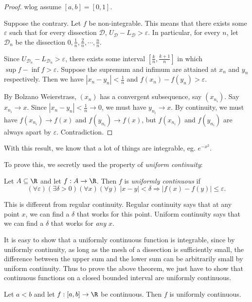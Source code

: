 \documentclass[a4paper]{article}
\begin{document}
\begin{proof}
  wlog assume $[a, b] = [0, 1]$.

  Suppose the contrary. Let $f$ be non-integrable. This means that there exists some $\varepsilon$ such that for every dissection $\mathcal{D}$, $U_{\mathcal{D}} - L_{\mathcal{D}} > \varepsilon$. In particular, for every $n$, let $\mathcal{D}_n$ be the dissection $0, \frac{1}{n}, \frac{2}{n}, \cdots, \frac{n}{n}$.

  Since $U_{\mathcal{D}_n} - L_{\mathcal{D}_n} > \varepsilon$, there exists some interval $\left[\frac{k}{n}, \frac{k + 1}{n}\right]$ in which $\sup f - \inf f > \varepsilon$. Suppose the supremum and infimum are attained at $x_n$ and $y_n$ respectively. Then we have $|x_n - y_n| < \frac{1}{n}$ and $f(x_n) - f(y_n) > \varepsilon$.

  By Bolzano Weierstrass, $(x_n)$ has a convergent subsequence, say $(x_{n_i})$. Say $x_{n_i}\to x$. Since $|x_n - y_n| < \frac{1}{n}\to 0$, we must have $y_{n_i}\to x$. By continuity, we must have $f(x_{n_i}) \to f(x)$ and $f(y_{n_i}) \to f(x)$, but $f(x_{n_i})$ and $f(y_{n_i})$ are always apart by $\varepsilon$. Contradiction.
\end{proof}
With this result, we know that a lot of things are integrable, eg. $e^{-x^2}$.

To prove this, we secretly used the property of \emph{uniform continuity}:
\begin{defi}
  Let $A\subseteq \R$ and let $f: A\to \R$. Then $f$ is \emph{uniformly continuous} if
  \[
    (\forall \varepsilon)(\exists \delta > 0)(\forall x)(\forall y)\;|x - y| < \delta \Rightarrow |f(x) - f(y)| \leq \varepsilon.
  \]
\end{defi}
This is different from regular continuity. Regular continuity says that at any point $x$, we can find a $\delta$ that works for this point. Uniform continuity says that we can find a $\delta$ that works for \emph{any} $x$.

It is easy to show that a uniformly continuous function is integrable, since by uniformly continuity, as long as the mesh of a dissection is sufficiently small, the difference between the upper sum and the lower sum can be arbitrarily small by uniform continuity. Thus to prove the above theorem, we just have to show that continuous functions on a closed bounded interval are uniformly continuous.

\begin{thm}
  Let $a < b$ and let $f: [a, b] \to \R$ be continuous. Then $f$ is uniformly continuous.
\end{thm}
\end{document}
